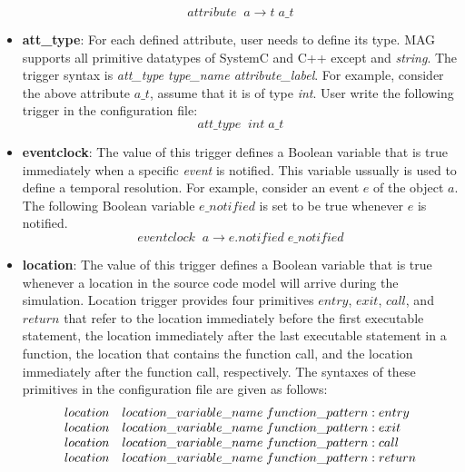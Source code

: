 \documentclass{llncs}
\begin{document}
\begin{itemize}
\begin{displaymath}
attribute \; \; a\rightarrow t \; a\_t
\end{displaymath}
\item \textbf{att\_type}: For each defined attribute, user needs to define its type. MAG supports all primitive datatypes of SystemC and C++ except  and \textit{string}. The trigger syntax is \textit{att\_type type\_name attribute\_label}. For example, consider the above attribute $a\_t$, assume that it is of type \textit{int}. User write the following trigger in the configuration file:
\begin{displaymath}
att\_type \; \; int \; a\_t
\end{displaymath}
\item \textbf{eventclock}: The value of this trigger defines a Boolean variable that is true immediately when a specific \textit{event} is notified. This variable ussually is used to define a temporal resolution. For example, consider an event $e$ of the object $a$. The following Boolean variable $e\_notified$ is set to be true whenever $e$ is notified.
\begin{displaymath}
eventclock \; \; a\rightarrow e.notified \; e\_notified
\end{displaymath}
\item \textbf{location}: The value of this trigger defines a Boolean variable that is true whenever a location in the source code model will arrive during the simulation. Location trigger provides four primitives $entry$, $exit$, $call$, and $return$ that refer to the location immediately before the first executable statement, the location immediately after the last executable statement in a function, the location that contains the function call, and the location immediately after the function call, respectively. The syntaxes of these primitives in the configuration file are given as follows:
\begin{displaymath}
\begin{array}{l l}
location & location\_variable\_name \; function\_pattern : entry\\
location & location\_variable\_name \; function\_pattern : exit\\
location & location\_variable\_name \; function\_pattern : call\\
location & location\_variable\_name \; function\_pattern : return\\
\end{array}
\end{displaymath}

\end{itemize}
\end{document}
